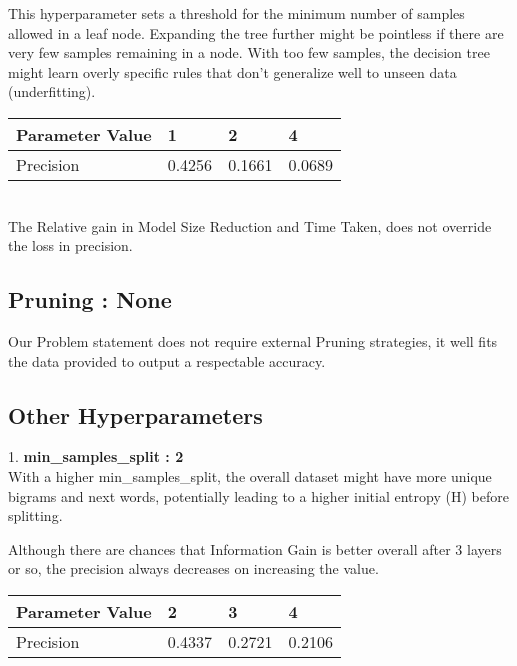 \documentclass{article}
\begin{document}
This hyperparameter sets a threshold for the minimum number of samples allowed in a leaf node. Expanding the tree further might be pointless if there are very few samples remaining in a node. With too few samples, the decision tree might learn overly specific rules that don't generalize well to unseen data (underfitting).\\
\begin{table}[h]
  \begin{tabular}{|l|l|l|l|}
  \hline
  Parameter Value & 1      & 2      & 4      \\ \hline
  Precision       & 0.4256 & 0.1661 & 0.0689 \\ \hline
  \end{tabular}
  \end{table}\\

  The Relative gain in Model Size Reduction and Time Taken, does not override the loss in precision.

  \subsection{Pruning : None}
  Our Problem statement does not require external Pruning strategies, it well fits the data provided to output a respectable accuracy.
  \subsection{Other Hyperparameters}

  1. \textbf{min\_samples\_split : 2}\\
  With a higher min\_samples\_split, the overall dataset might have more unique bigrams and next words, potentially leading to a higher initial entropy (H) before splitting.

  Although there are chances that Information Gain is better overall after 3 layers or so, the precision always decreases on increasing the value.

  \begin{table}[h]
    \begin{tabular}{|l|l|l|l|}
    \hline
    Parameter Value & 2      & 3      & 4      \\ \hline
    Precision       & 0.4337 & 0.2721 & 0.2106 \\ \hline
    \end{tabular}
    \end{table}
  \begin{table}
    
  \end{table}
\end{document}
